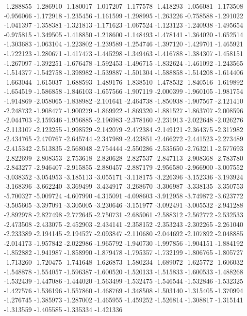 -1.288855
-1.286910
-1.180017
-1.017207
-1.177578
-1.418293
-1.056081
-1.173508
-0.956066
-1.172918
-1.235456
-1.161599
-1.298995
-1.263226
-0.758588
-1.291022
-1.041397
-1.358381
-1.321813
-1.171623
-1.067524
-1.123123
-1.240938
-1.495654
-0.975815
-1.349505
-1.418850
-1.218600
-1.148493
-1.478141
-1.364020
-1.652514
-1.303683
-1.063104
-1.223802
-1.239589
-1.254746
-1.397120
-1.429701
-1.465921
-1.722123
-1.280671
-1.417473
-1.445298
-1.349463
-1.416788
-1.384307
-1.458151
-1.267097
-1.392251
-1.676478
-1.592453
-1.496715
-1.832624
-1.461092
-1.243565
-1.514377
-1.542758
-1.398982
-1.539887
-1.501304
-1.588858
-1.514208
-1.614406
-1.663044
-1.615037
-1.688593
-1.489176
-1.838510
-1.478532
-1.840516
-1.619892
-1.654519
-1.586858
-1.846103
-1.657566
-1.907119
-2.000399
-1.960105
-1.981754
-1.914869
-2.058065
-1.838982
-2.101641
-2.464738
-1.850938
-1.907567
-2.121410
-2.248732
-1.908477
-1.900279
-1.869922
-1.869320
-1.881527
-1.863707
-2.008596
-2.044703
-2.159346
-1.956885
-2.196983
-2.378160
-2.231913
-2.022648
-2.026276
-2.113107
-2.123255
-1.998529
-2.142079
-2.472384
-2.149121
-2.364375
-2.317982
-2.434765
-2.470767
-2.645744
-2.347989
-2.423851
-2.466272
-2.441523
-2.273489
-2.415342
-2.513835
-2.568048
-2.754444
-2.550286
-2.535650
-2.763211
-2.577693
-2.822699
-2.808353
-2.753618
-2.820628
-2.827537
-2.847113
-2.908368
-2.783780
-2.843277
-2.946407
-2.915855
-2.880457
-2.887179
-2.956580
-2.966900
-3.007552
-3.038352
-3.054953
-3.185113
-3.055171
-3.118175
-3.226396
-3.152336
-3.193924
-3.168396
-3.662240
-3.369499
-3.434917
-3.268670
-3.306987
-3.338135
-3.350753
-5.700327
-5.009724
-4.607990
-4.315091
-4.098603
-3.912958
-3.749872
-3.623772
-3.505605
-3.397091
-3.305005
-3.230646
-3.151977
-3.092491
-3.005532
-2.941288
-2.892978
-2.827498
-2.772645
-2.750731
-2.685061
-2.588312
-2.562772
-2.532533
-2.473508
-2.433075
-2.452903
-2.434141
-2.358152
-2.353243
-2.302265
-2.261040
-2.233389
-2.194145
-2.194527
-2.093847
-2.110680
-2.044692
-2.107892
-2.048885
-2.014173
-1.957842
-2.022986
-1.965792
-1.940730
-1.997856
-1.904151
-1.884192
-1.852882
-1.941987
-1.858990
-1.879478
-1.795357
-1.732199
-1.806765
-1.805727
-1.713260
-1.720475
-1.741648
-1.626873
-1.580234
-1.689072
-1.625772
-1.606032
-1.548878
-1.554057
-1.596387
-1.600520
-1.520133
-1.515833
-1.600533
-1.488268
-1.532439
-1.447086
-1.444020
-1.563499
-1.532475
-1.546544
-1.532846
-1.532325
-1.427576
-1.536196
-1.557860
-1.468769
-1.348508
-1.503140
-1.315405
-1.370994
-1.276745
-1.385973
-1.287002
-1.465955
-1.459252
-1.526814
-1.308817
-1.315141
-1.313559
-1.405585
-1.335334
-1.421336
